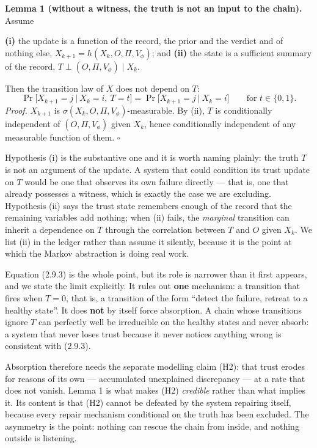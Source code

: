 \documentclass[11pt,a4paper]{article}
\begin{document}
\textbf{Lemma 1 (without a witness, the truth is not an input to the chain).} Assume

\textbf{(i)} the update is a function of the record, the prior and the verdict and of
nothing else, \(X_{k+1}=h(X_k,O,\Pi,V_\phi)\); and
\textbf{(ii)} the state is a sufficient summary of the record,
\(T\perp(O,\Pi,V_\phi)\mid X_k\).

Then the transition law of \(X\) does not depend on \(T\):
\begin{equation}
\Pr\big[X_{k+1}=j\ \big|\ X_k=i,\ T=t\big]
=
\Pr\big[X_{k+1}=j\ \big|\ X_k=i\big]
\qquad\text{for } t\in\{0,1\}.
\tag{2.9.3}
\end{equation}
\emph{Proof.} \(X_{k+1}\) is \(\sigma(X_k,O,\Pi,V_\phi)\)-measurable. By (ii), \(T\) is
conditionally independent of \((O,\Pi,V_\phi)\) given \(X_k\), hence conditionally
independent of any measurable function of them. \(\square\)

Hypothesis (i) is the substantive one and it is worth naming plainly: the truth
\(T\) is not an argument of the update. A system that could condition its trust
update on \(T\) would be one that observes its own failure directly --- that is, one
that already possesses a witness, which is exactly the case we are excluding.
Hypothesis (ii) says the trust state remembers enough of the record that the
remaining variables add nothing; when (ii) fails, the \emph{marginal} transition can
inherit a dependence on \(T\) through the correlation between \(T\) and \(O\) given
\(X_k\). We list (ii) in the ledger rather than assume it silently, because it is
the point at which the Markov abstraction is doing real work.

Equation (2.9.3) is the whole point, but its role is narrower than it first
appears, and we state the limit explicitly. It rules out \textbf{one} mechanism: a
transition that fires when \(T=0\), that is, a transition of the form ``detect the
failure, retreat to a healthy state''. It does \textbf{not} by itself force absorption.
A chain whose transitions ignore \(T\) can perfectly well be irreducible on the
healthy states and never absorb: a system that never loses trust because it never
notices anything wrong is consistent with (2.9.3).

Absorption therefore needs the separate modelling claim (H2): that trust erodes
for reasons of its own --- accumulated unexplained discrepancy --- at a rate that does
not vanish. Lemma 1 is what makes (H2) \emph{credible} rather than what implies it. Its
content is that (H2) cannot be defeated by the system repairing itself, because
every repair mechanism conditional on the truth has been excluded. The asymmetry
is the point: nothing can rescue the chain from inside, and nothing outside is
listening.
\end{document}
